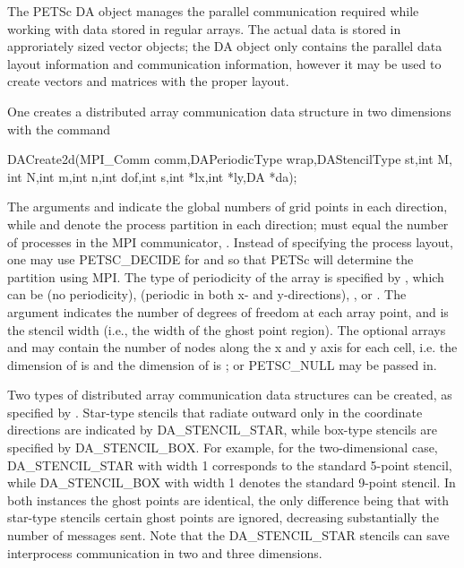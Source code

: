 The PETSc DA object manages the parallel communication required
while working with data stored in regular arrays. The actual data
is stored in approriately sized vector objects; the DA object 
only contains the parallel data layout information and communication
information, however it may be used to create vectors and matrices with the
proper layout.

One creates a distributed array communication data structure 
in two dimensions with the command 
\begin{tabbing}
  DACreate2d(MPI\_Comm comm,DAPeriodicType wrap,DAStencilType st,int M,\\
             int N,int m,int n,int dof,int s,int *lx,int *ly,DA *da);
\end{tabbing}
The   arguments
  and  indicate the global
numbers of grid points in each direction, while  and 
denote the process partition in each direction;  must equal
the number of processes in the MPI communicator, .  
Instead of specifying the process layout, one may use
PETSC_DECIDE for  and  
so that PETSc will determine the partition using MPI. The type of
periodicity of the array is specified by , which can be 
  (no periodicity), 
  (periodic in
both x- and y-directions),  , 
or .  The argument  
indicates the number of degrees of freedom at each array point,
and  is the stencil width (i.e., the width of the ghost point region).
The optional arrays  and  may contain the number of nodes
along the x and y axis for each cell, i.e. the dimension of  is
 and the dimension of  is ; or PETSC_NULL 
may be passed in.

Two types of distributed array communication data structures 
can be created, as specified by .
Star-type stencils that radiate outward only in the coordinate
directions are indicated by DA_STENCIL_STAR,
while box-type stencils are specified by
DA_STENCIL_BOX. For example, for the
two-dimensional case,
DA_STENCIL_STAR with width 1 corresponds to the standard 5-point
stencil, while DA_STENCIL_BOX with width 1 denotes the
standard 9-point stencil.  In both instances the ghost points are
identical, the only difference being that with star-type stencils
certain ghost points are ignored, decreasing substantially
the number of messages sent.  Note that the DA_STENCIL_STAR
stencils can save interprocess communication in two and three
dimensions.

